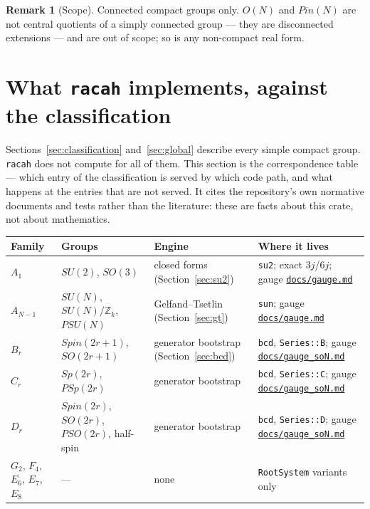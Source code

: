 \documentclass[11pt,a4paper]{article}
\theoremstyle{plain}
\theoremstyle{definition}
\newtheorem{remark}[theorem]{Remark}
\newcommand{\ZZ}{\mathbb{Z}}
\newcommand{\code}[1]{\texttt{#1}}
\newcommand{\gaugemd}{\href{https://github.com/Ryo-wtnb11/racah/blob/main/docs/gauge.md}{\code{docs/gauge.md}}}
\newcommand{\gaugeson}{\href{https://github.com/Ryo-wtnb11/racah/blob/main/docs/gauge_soN.md}{\code{docs/gauge\_soN.md}}}
\begin{document}
\begin{remark}[Scope]
Connected compact groups only. $O(N)$ and $Pin(N)$ are not central quotients of
a simply connected group --- they are disconnected extensions --- and are out
of scope; so is any non-compact real form.
\end{remark}

\section{What \code{racah} implements, against the classification}
\label{sec:racah}

Sections~\ref{sec:classification} and~\ref{sec:global} describe every simple
compact group. \code{racah} does not compute for all of them. This section is
the correspondence table --- which entry of the classification is served by
which code path, and what happens at the entries that are not served. It cites
the repository's own normative documents and tests rather than the literature:
these are facts about this crate, not about mathematics.

\begin{center}
\small
\begin{tabular}{@{}p{2.1cm}p{2.5cm}p{3.1cm}p{5.4cm}@{}}
\toprule
Family & Groups & Engine & Where it lives \\
\midrule
$A_1$ & $SU(2)$, $SO(3)$ &
  closed forms (Section~\ref{sec:su2}) &
  \code{su2}; exact $3j$/$6j$; gauge \gaugemd{} \\
$A_{N-1}$ & $SU(N)$, $SU(N)/\ZZ_k$, $PSU(N)$ &
  Gelfand--Tsetlin (Section~\ref{sec:gt}) &
  \code{sun}; gauge \gaugemd{} \\
$B_r$ & $Spin(2r+1)$, $SO(2r+1)$ &
  generator bootstrap (Section~\ref{sec:bcd}) &
  \code{bcd}, \code{Series::B}; gauge \gaugeson{} \\
$C_r$ & $Sp(2r)$, $PSp(2r)$ &
  generator bootstrap &
  \code{bcd}, \code{Series::C}; gauge \gaugeson{} \\
$D_r$ & $Spin(2r)$, $SO(2r)$, $PSO(2r)$, half-spin &
  generator bootstrap &
  \code{bcd}, \code{Series::D}; gauge \gaugeson{} \\
$G_2$, $F_4$, $E_6$, $E_7$, $E_8$ & --- &
  none &
  \code{RootSystem} variants only \\
\bottomrule
\end{tabular}
\end{center}
\end{document}
